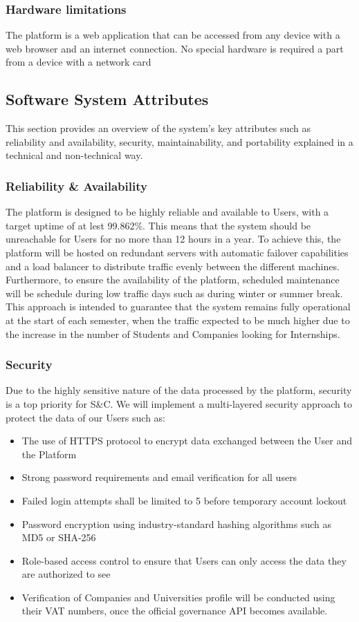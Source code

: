 \subsubsection{Hardware limitations}
The platform is a web application that can be accessed from any device with a web browser and an internet connection. No special hardware is required a part from a device with a network card
\subsection{Software System Attributes}
This section provides an overview of the system's key attributes such as reliability and availability, security, maintainability, and portability explained in a technical and non-technical way.
\subsubsection{Reliability \& Availability}
The platform is designed to be highly reliable and available to Users, with a target uptime of at lest 99.862\%. This means that the system should be unreachable for Users for no more than 12 hours in a year. To achieve this, the platform will be hosted on redundant servers with automatic failover capabilities and a load balancer to distribute traffic evenly between the different machines. \\
Furthermore, to ensure the availability of the platform, scheduled maintenance will be schedule during low traffic days such as during winter or summer break.\\
This approach is intended to guarantee that the system remains fully operational at the start of each semester, when the traffic expected to be much higher due to the increase in the number of Students and Companies looking for Internships.\\
\subsubsection{Security}
Due to the highly sensitive nature of the data processed by the platform, security is a top priority for S\&C. We will implement a multi-layered security approach to protect the data of our Users such as:
\begin{itemize}
  \item The use of HTTPS protocol to encrypt data exchanged between the User and the Platform
  \item Strong password requirements and email verification for all users
  \item Failed login attempts shall be limited to 5 before temporary account lockout
  \item Password encryption using industry-standard hashing algorithms such as MD5 or SHA-256
  \item Role-based access control to ensure that Users can only access the data they are authorized to see
  \item Verification of Companies and Universities profile will be conducted using their VAT numbers, once the official governance API becomes available.
\end{itemize}

